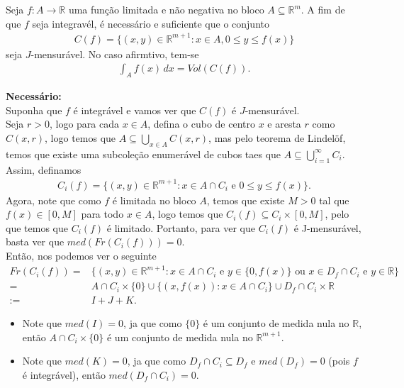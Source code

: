 \begin{homeworkProblem}[Seção 3-5]
  Seja $f:A\to\mathbb{R}$ uma função limitada e não negativa no bloco $A\subseteq\mathbb{R}^{m}$. A fim de que $f$ seja integravél, é necessário e suficiente que o conjunto
  \begin{align*}
    C(f)=\{(x,y)\in\mathbb{R}^{m+1}:x\in A,0\leq y\leq f(x)\}
  \end{align*}
  seja $J$-mensurável. No caso afirmtivo, tem-se
  \begin{align*}
    \int_{A}f(x)\,dx=Vol(C(f)).
  \end{align*}
  \begin{solution}
  \textbf{Necessário:}\\
    Suponha que $f$ é integrável e vamos ver que $C(f)$ é $J$-mensurável.\\
    Seja $r>0$, logo para cada $x\in A$, defina o cubo de centro $x$ e aresta $r$ como $C(x,r)$, logo temos que $A\subseteq \bigcup_{x\in A}C(x,r)$, mas pelo teorema de Lindelöf, temos que existe uma subcoleção enumerável de cubos taes que $A\subseteq \bigcup_{i=1}^{\infty}C_i$.\\
    Assim, definamos
    \begin{align*}
      C_i(f)=\{(x,y)\in\mathbb{R}^{m+1}:x\in A\cap C_i\text{ e }0\leq y\leq f(x)\}.
    \end{align*}
    Agora, note que como $f$ é limitada no bloco $A$, temos que existe $M>0$ tal que $f(x)\in [0,M]$ para todo $x\in A$, logo temos que $C_i(f)\subseteq C_i\times [0,M]$, pelo que temos que $C_i(f)$ é limitado. Portanto, para ver que $C_i(f)$ é J-mensurável, basta ver que $med(Fr(C_i(f)))=0$.\\
    Então, nos podemos ver o seguinte
    \begin{align*}
      Fr(C_i(f))=&\{(x,y)\in \mathbb{R}^{m+1}:x\in A\cap C_i\text{ e }y\in\{0,f(x)\}\text{ ou }x\in D_f\cap C_i\text{ e }y\in\mathbb{R}\}\\
      =&A\cap C_i\times \{0\}\cup \{(x,f(x)):x\in A\cap C_i\}\cup D_f\cap C_i\times \mathbb{R}\\
      :=& I+J+K.
    \end{align*}
    \begin{itemize}
      \item Note que $med(I)=0$, ja que como $\{0\}$ é um conjunto de medida nula no $\mathbb{R}$, então $A\cap C_i\times \{0\}$ é um conjunto de medida nula no $\mathbb{R}^{m+1}$.
      \item Note que $med(K)=0$, ja que como $D_f\cap C_i\subseteq D_f$ e $med(D_f)=0$ (pois $f$ é integrável), então $med(D_f\cap C_i)=0$.

\end{itemize}
\end{solution}
\end{homeworkProblem}
